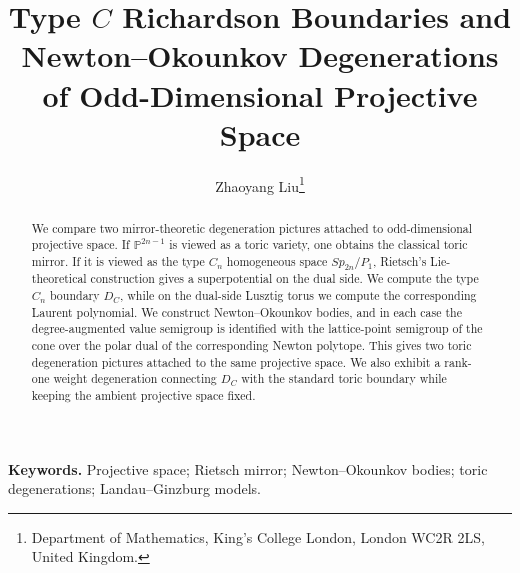 \documentclass{article}
\newcommand{\PP}{\mathbb{P}}
\begin{document}
\title{Type \(C\) Richardson Boundaries and Newton--Okounkov Degenerations of Odd-Dimensional Projective Space}
\author{Zhaoyang Liu\thanks{Department of Mathematics, King's College London, London WC2R 2LS, United Kingdom.}}
\date{}
\maketitle

\begin{abstract}
We compare two mirror-theoretic degeneration pictures attached to odd-dimensional projective space. If \(\PP^{2n-1}\) is viewed as a toric variety, one obtains the classical toric mirror. If it is viewed as the type \(C_n\) homogeneous space \(Sp_{2n}/P_1\), Rietsch's Lie-theoretical construction gives a superpotential on the dual side. We compute the type \(C_n\) boundary \(D_C\), while on the dual-side Lusztig torus we compute the corresponding Laurent polynomial. We construct Newton--Okounkov bodies, and in each case the degree-augmented value semigroup is identified with the lattice-point semigroup of the cone over the polar dual of the corresponding Newton polytope. This gives two toric degeneration pictures attached to the same projective space. We also exhibit a rank-one weight degeneration connecting \(D_C\) with the standard toric boundary while keeping the ambient projective space fixed.
\end{abstract}

\smallskip
\noindent\textbf{Keywords.} Projective space; Rietsch mirror; Newton--Okounkov bodies; toric degenerations; Landau--Ginzburg models.








\end{document}
